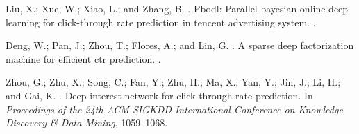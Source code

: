 \documentclass[sigconf]{acmart}
\begin{document}
\begin{thebibliography}{10}
Liu, X.; Xue, W.; Xiao, L.; and Zhang, B.
.
\newblock Pbodl: Parallel bayesian online deep learning for click-through rate
  prediction in tencent advertising system.
.

Deng, W.; Pan, J.; Zhou, T.; Flores, A.; and Lin, G.
.
\newblock A sparse deep factorization machine for efficient ctr prediction.
.

Zhou, G.; Zhu, X.; Song, C.; Fan, Y.; Zhu, H.; Ma, X.; Yan, Y.; Jin, J.; Li,
  H.; and Gai, K.
.
\newblock Deep interest network for click-through rate prediction.
\newblock In {\em Proceedings of the 24th ACM SIGKDD International Conference
  on Knowledge Discovery \& Data Mining},  1059--1068.

\end{thebibliography}
\end{document}
